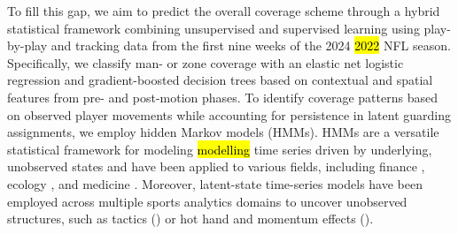 \documentclass[namedate,webpdf,modern,medium]{oup-authoring-template}
\providecommand{\DIFadd}[1]{\ifmmode{#1}\else\hl{#1}\fi} %
\providecommand{\DIFdel}[1]{{\protect\color{red}#1}} %
\providecommand{\DIFaddbegin}{} %
\providecommand{\DIFaddend}{} %
\providecommand{\DIFdelbegin}{} %
\providecommand{\DIFdelend}{} %
\begin{document}
To fill this gap, we aim to predict the overall coverage scheme through a hybrid statistical framework combining unsupervised and supervised learning using play-by-play and tracking data from the first nine weeks of the \DIFdelbegin \DIFdel{2024 }\DIFdelend \DIFaddbegin \DIFadd{2022 }\DIFaddend NFL season. Specifically, we classify man- or zone coverage with an elastic net logistic regression and gradient-boosted decision trees based on contextual and spatial features from pre- and post-motion phases. 
To identify coverage patterns based on observed player movements while accounting for persistence in latent guarding assignments, we employ hidden Markov models (HMMs).
HMMs are a versatile statistical framework for \DIFdelbegin \DIFdel{modeling }\DIFdelend \DIFaddbegin \DIFadd{modelling }\DIFaddend time series driven by underlying, unobserved states and have been applied to various fields, including finance \citep{liu2012stock, zhang2019high}, ecology \citep{mcclintock2020uncovering, mews2022multistate}, and medicine \citep{amoros2019continuous, soper2020hidden}.
Moreover, latent-state time-series models have been employed across multiple sports analytics domains to uncover unobserved structures, such as tactics (\citealp{otting2023football, adam2024markov}) or hot hand and momentum effects (\citealp{albert93, michels2023bettors, winkelmann2025momentum}).
\end{document}
